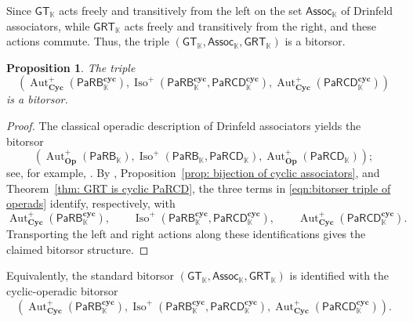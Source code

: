 \documentclass{amsart}
\newcommand{\chandan}[1]{\todo[color=yellow!90!black]{\rm #1 \\ \hfill --- C.}}
\newcommand{\kk}{\mathbb{K}}    %
\newcommand{\PaRB}{\mathsf{PaRB}}
\newcommand{\PaRCD}{\mathsf{PaRCD}}
\newcommand{\hPaRB}{{\PaRB}_{\kk}}
\newcommand{\hPaRCD}{{\PaRCD}_{\kk}}
\newcommand{\cyc}{\mathbf{cyc}}
\newcommand{\Cyc}{\mathbf{Cyc}}
\newcommand{\Op}{\mathbf{Op}}
\newcommand{\Iso}{\operatorname{Iso}}
\newcommand{\Aut}{\operatorname{Aut}}
\newcommand{\GT}{{\mathsf{GT}}}
\newcommand{\GRT}{{\mathsf{GRT}}}
\newcommand{\Assoc}{\mathsf{Assoc}}
\newtheorem{prop}[theorem]{Proposition}%
\theoremstyle{definition}
\newtheorem{remark}[theorem]{Remark}%
\numberwithin{equation}{section}
\begin{document}
Since $\GT_{\kk}$ acts freely and transitively from the left on the set $\Assoc_{\kk}$ of Drinfeld associators, while $\GRT_{\kk}$ acts freely and transitively from the right, and these actions commute. Thus, the triple $(\GT_{\kk},\Assoc_{\kk},\GRT_{\kk})$ is a bitorsor.

\begin{prop}\label{prop: bitorsor triple}
The triple
\[
(\Aut^{+}_{\Cyc}(\hPaRB^{\cyc}), \Iso^{+}(\hPaRB^{\cyc}, \hPaRCD^{\cyc}), \Aut^{+}_{\Cyc}(\hPaRCD^{\cyc}))
\]
is a bitorsor.
\end{prop}

\begin{proof}
The classical operadic description of Drinfeld associators yields the bitorsor
\begin{equation}\label{eqn:bitorser triple of operads}
(\Aut^{+}_{\Op}(\hPaRB), \Iso^{+}(\hPaRB, \hPaRCD), \Aut^{+}_{\Op}(\hPaRCD));
\end{equation}
see, for example, \cite{FresseBook1}. By \cite[Theorem 7.7]{RS2025cyclicgt}, Proposition~\ref{prop: bijection of cyclic associators}, and Theorem~\ref{thm: GRT is cyclic PaRCD}, the three terms in \eqref{eqn:bitorser triple of operads} identify, respectively, with
\[
\Aut^{+}_{\Cyc}(\hPaRB^{\cyc}), \qquad
\Iso^{+}(\hPaRB^{\cyc}, \hPaRCD^{\cyc}), \qquad
\Aut^{+}_{\Cyc}(\hPaRCD^{\cyc}).
\]
Transporting the left and right actions along these identifications gives the claimed bitorsor structure.
\end{proof}

Equivalently, the standard bitorsor $(\GT_{\kk},\Assoc_{\kk},\GRT_{\kk})$ is identified with the cyclic-operadic bitorsor
\[
(\Aut^{+}_{\Cyc}(\hPaRB^{\cyc}), \Iso^{+}(\hPaRB^{\cyc}, \hPaRCD^{\cyc}), \Aut^{+}_{\Cyc}(\hPaRCD^{\cyc})).
\]

\end{document}
